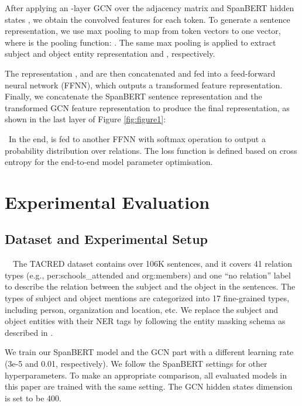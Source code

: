 \documentclass{article}
\begin{document}
After applying an -layer GCN over the adjacency matrix  and SpanBERT hidden states , we obtain the convolved features for each token. To generate a sentence representation, we use  max pooling  to map from  token vectors to one vector, 
where  is the pooling function: . The same max pooling is applied to extract subject and object entity representation  and , respectively.






The representation ,  and 
are then concatenated  and fed into a feed-forward neural network (FFNN), which outputs a transformed feature representation. Finally, we concatenate the SpanBERT sentence representation  and the transformed GCN feature representation to produce the final representation, as shown in the last layer of Figure \ref{fig:figure1}:

\
In the end,   is fed to another FFNN with softmax operation to output a probability distribution over relations.
The loss function is defined based on cross entropy for the end-to-end model parameter optimisation. 
\
\section{Experimental Evaluation}
\subsection{Dataset and Experimental Setup}
\
\
The TACRED dataset \cite{zhang2017position} contains over 106K sentences, and it covers 41 relation types (e.g., per:schools\_attended and org:members) and one ``no relation'' label to describe the relation between the subject and the object in the sentences. The types of subject and object mentions are categorized into 17 fine-grained types, including person, organization and location, etc. We replace the subject and object entities with their NER tags by following the entity masking schema as described in \cite{zhang2017position}.

We train our SpanBERT model and the GCN part with a different learning rate (3e-5 and 0.01, respectively). We follow the SpanBERT settings for other hyperparameters.  To make an appropriate comparison, all evaluated models in this paper are trained with the same setting. The GCN hidden states dimension is set to be 400.
\end{document}
